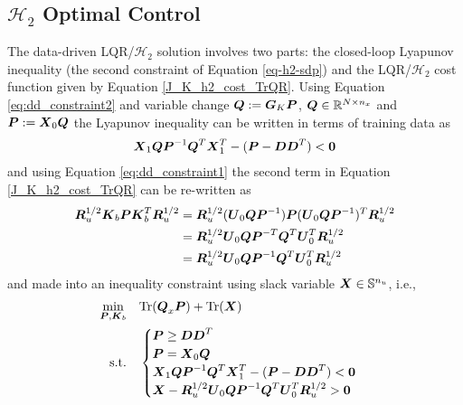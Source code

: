 \subsection{$\mathcal{H}_{2}$ Optimal Control}
The data-driven LQR/$\mathcal{H}_{2}$ solution involves two parts: the closed-loop Lyapunov inequality (the second constraint of Equation \eqref{eq-h2-sdp}) and the LQR/$\mathcal{H}_{2}$ cost function given by Equation \eqref{J_K_h2_cost_TrQR}.  Using Equation \eqref{eq:dd_constraint2} and variable change $\vb*{Q} := \vb*{G}_{K}\vb*{P}$, $\vb*{Q} \in \mathbb{R}^{N \times n_{x}}$ and $\vb*{P} := \vb*{X}_{0}\vb*{Q}$ the Lyapunov inequality can be written in terms of training data as
\begin{equation}
\label{eq:h2_lyap_dd}
\begin{aligned}
	\vb*{X}_{1}\vb*{Q} \vb*{P}^{-1} \vb*{Q}^{T}\vb*{X}_{1}^{T} - (\vb*{P} - \vb*{D}\vb*{D}^{T}) < \vb*{0}
\end{aligned}
\end{equation}
and using Equation \eqref{eq:dd_constraint1} the second term in Equation \eqref{J_K_h2_cost_TrQR} can be re-written as
\begin{equation}
\label{eq:h2_cost_dd}
\begin{aligned}
	\vb*{R}_{u}^{1/2}\vb*{K}_{b}\vb*{P}\vb*{K}_{b}^{T}\vb*{R}_{u}^{1/2} &=
		\vb*{R}_{u}^{1/2}(\vb*{U}_{0}\vb*{Q}\vb*{P}^{-1})\vb*{P}(\vb*{U}_{0}\vb*{Q}\vb*{P}^{-1})^{T}\vb*{R}_{u}^{1/2}\\
	&= \vb*{R}_{u}^{1/2}\vb*{U}_{0}\vb*{Q}\vb*{P}^{-T}\vb*{Q}^{T}\vb*{U}_{0}^{T}\vb*{R}_{u}^{1/2}\\
	&= \vb*{R}_{u}^{1/2}\vb*{U}_{0}\vb*{Q}\vb*{P}^{-1}\vb*{Q}^{T}\vb*{U}_{0}^{T}\vb*{R}_{u}^{1/2}
\end{aligned}
\end{equation}
and made into an inequality constraint using slack variable $\vb*{X} \in \mathbb{S}^{n_{u}}$, i.e.,
\begin{equation}
\label{eq-h2-sdp2}
\begin{aligned}
	\underset{\vb*{P}, \vb*{K}_{b}}{\min} \quad & \text{Tr}(\vb*{Q}_{x}\vb*{P}) + \text{Tr}(\vb*{X})\\
	\textrm{s.t.} \quad & \begin{cases}
		\vb*{P} \geq \vb*{D}\vb*{D}^{T}\\
		\vb*{P} = \vb*{X}_{0}\vb*{Q}\\
		\vb*{X}_{1}\vb*{Q} \vb*{P}^{-1} \vb*{Q}^{T}\vb*{X}_{1}^{T} - (\vb*{P} - \vb*{D}\vb*{D}^{T}) < \vb*{0}\\
		\vb*{X} - \vb*{R}_{u}^{1/2}\vb*{U}_{0}\vb*{Q}\vb*{P}^{-1}\vb*{Q}^{T}\vb*{U}_{0}^{T}\vb*{R}_{u}^{1/2} > \vb*{0}
	\end{cases}
\end{aligned}
\end{equation}

